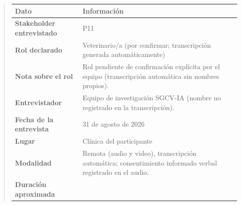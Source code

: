 \documentclass[
]{article}
\newcounter{none} %
\begin{document}
\begin{quote}
{\def\LTcaptype{none} %
\begin{longtable}[]{|
  >{\raggedright\arraybackslash}p{}|
  >{\raggedright\arraybackslash}p{}|}
\hline
\begin{minipage}[b]{\linewidth}\centering
\textbf{Dato}
\end{minipage} & \begin{minipage}[b]{\linewidth}\centering
\textbf{Información}
\end{minipage} \\
\hline
\endhead
\hline
\endlastfoot
\textbf{Stakeholder entrevistado} & \begin{minipage}[t]{\linewidth}\raggedright
P11
\end{minipage} \\
\hline
\textbf{Rol declarado} & \begin{minipage}[t]{\linewidth}\raggedright
Veterinario/a (por confirmar; transcripción generada automáticamente)
\end{minipage} \\
\hline
\textbf{Nota sobre el rol} & \begin{minipage}[t]{\linewidth}\raggedright
Rol pendiente de confirmación explícita por el equipo (transcripción automática sin nombres propios).
\end{minipage} \\
\hline
\textbf{Entrevistador} & \begin{minipage}[t]{\linewidth}\raggedright
Equipo de investigación SGCV-IA (nombre no registrado en la transcripción).
\end{minipage} \\
\hline
\textbf{Fecha de la entrevista} & \begin{minipage}[t]{\linewidth}\raggedright
31 de agosto de 2026
\end{minipage} \\
\hline
\textbf{Lugar} & \begin{minipage}[t]{\linewidth}\raggedright
Clínica del participante
\end{minipage} \\
\hline
\textbf{Modalidad} & \begin{minipage}[t]{\linewidth}\raggedright
Remota (audio y video), transcripción automática; consentimiento informado verbal registrado en el audio.
\end{minipage} \\
\hline
\textbf{Duración aproximada} & \begin{minipage}[t]{\linewidth}\raggedright

\end{minipage}
\end{longtable}}
\end{quote}
\end{document}
